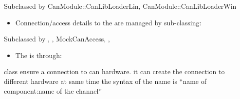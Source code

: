 \documentclass[letterpaper,10pt,english]{sphinxmanual}
\begin{document}
\begin{fulllineitems}
\label{\detokenize{standardApi:_CPPv4N9CanModule12CanLibLoaderE}}%
\pysigstartmultiline
{}\label{\detokenize{standardApi:classCanModule_1_1CanLibLoader}}%
\pysigstopmultiline
Subclassed by CanModule::CanLibLoaderLin, CanModule::CanLibLoaderWin

\end{fulllineitems}

\begin{itemize}
\item {} 
Connection/access details to the  are managed by sub-classing:

\end{itemize}

\begin{fulllineitems}
\label{\detokenize{standardApi:_CPPv4N9CanModule10CCanAccessE}}%
\pysigstartmultiline
{}\label{\detokenize{standardApi:classCanModule_1_1CCanAccess}}%
\pysigstopmultiline
Subclassed by {\hyperref[\detokenize{vendors/anagate:classAnaCanScan}]{}}, {\hyperref[\detokenize{vendors/systec:classCSockCanScan}]{}}, MockCanAccess, {\hyperref[\detokenize{vendors/peak:classPKCanScan}]{}}, {\hyperref[\detokenize{vendors/systec:classSTCanScan}]{}}

\end{fulllineitems}

\begin{itemize}
\item {} 
The  is through:

\end{itemize}

\begin{fulllineitems}
\label{\detokenize{standardApi:_CPPv4N9CanModule12CanBusAccessE}}%
\pysigstartmultiline
{}\label{\detokenize{standardApi:classCanModule_1_1CanBusAccess}}%
\pysigstopmultiline
{\hyperref[\detokenize{standardApi:classCanModule_1_1CanBusAccess}]{}} class ensure a connection to can hardware. it can create the connection to different hardware at same time the syntax of the name is “name of component:name of the channel” 

\end{fulllineitems}
\end{document}
